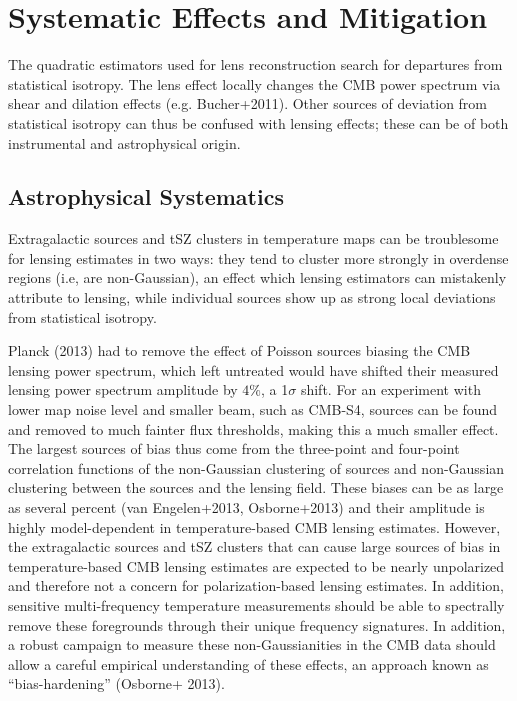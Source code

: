 \documentclass{tcibook}
\begin{document}
\section{Systematic Effects and Mitigation}\label{syst}
The quadratic estimators used for lens reconstruction search for departures from statistical isotropy.  The lens effect locally changes the CMB power spectrum via shear and dilation effects (e.g. Bucher+2011).  Other sources of deviation from statistical isotropy can thus be confused with lensing effects; these can be of both instrumental and astrophysical origin.

\subsection{Astrophysical Systematics}\label{systAst}
	
Extragalactic sources and tSZ clusters in temperature maps can be troublesome for lensing estimates in two ways: they tend to cluster more strongly in overdense regions (i.e, are non-Gaussian), an effect which
lensing estimators can mistakenly attribute to lensing, while individual sources show up as strong local deviations from statistical isotropy.  

Planck (2013) had to remove the effect of Poisson sources biasing the CMB lensing power spectrum, which left untreated would have shifted their measured lensing power spectrum amplitude by $4\%$, a  1$\sigma$ shift.  For an experiment with lower map noise level and smaller beam, such as CMB-S4, sources can be found and removed to much fainter flux thresholds, making this a much smaller effect.  The largest sources of bias thus come from the three-point and four-point correlation functions of the non-Gaussian clustering of sources and non-Gaussian clustering between the sources and the lensing field.  These biases can be as large as several percent (van Engelen+2013, Osborne+2013) and their amplitude is highly model-dependent in temperature-based CMB lensing estimates. However, the extragalactic sources and tSZ clusters that can cause large sources of bias in temperature-based CMB lensing estimates are expected to be nearly unpolarized and therefore not a concern for polarization-based lensing estimates. In
addition, sensitive multi-frequency temperature measurements should be able to spectrally remove these foregrounds through their unique frequency
signatures. In addition, a robust campaign to measure these non-Gaussianities in the CMB data should allow a careful empirical understanding of these
effects, an approach known as ``bias-hardening'' (Osborne+ 2013).  
\end{document}
